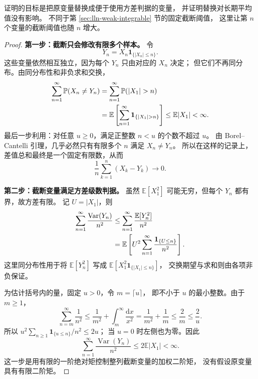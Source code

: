 \documentclass[UTF8]{ctexart}
\begin{document}
证明的目标是把原变量替换成便于使用方差判据的变量，
并证明替换对长期平均值没有影响。
不同于第 \ref{sec:lln-weak-integrable} 节的固定截断阈值，
这里让第 $n$ 个变量的截断阈值也随 $n$ 增大。

\begin{proof}
\textbf{第一步：截断只会修改有限多个样本。}
令
\[
  Y_n=X_n\mathbf1_{\{|X_n|\leq n\}}.
\]
这些变量依然相互独立，因为每个 $Y_n$ 只由对应的 $X_n$ 决定；
但它们不再同分布。由同分布性和非负求和交换，
\begin{align}
  \sum_{n=1}^\infty\mathbb P(X_n\neq Y_n)
  &=\sum_{n=1}^\infty\mathbb P(|X_1|>n) \notag\\
  &=\mathbb E\left[\sum_{n=1}^\infty
       \mathbf1_{\{|X_1|>n\}}\right]
  \leq\mathbb E|X_1|<\infty.
  \label{eq:lln-truncation-events}
\end{align}
最后一步利用：对任意 $u\geq0$，满足正整数 $n<u$ 的个数不超过 $u$。
由 Borel--Cantelli 引理，几乎必然只有有限多个 $n$ 满足 $X_n\neq Y_n$。
所以在这样的记录上，差值总和最终是一个固定有限数，从而
\begin{equation}
  \frac1n\sum_{k=1}^n(X_k-Y_k)\longrightarrow0.
  \label{eq:lln-truncation-difference}
\end{equation}

\textbf{第二步：截断变量满足方差级数判据。}
虽然 $\mathbb E[X_1^2]$ 可能无穷，但每个 $Y_n$ 都有界，故方差有限。
记 $U=|X_1|$，则
\begin{align}
  \sum_{n=1}^\infty\frac{\operatorname{Var}(Y_n)}{n^2}
  &\leq\sum_{n=1}^\infty\frac{\mathbb E[Y_n^2]}{n^2} \notag\\
  &=\mathbb E\left[
     U^2\sum_{n=1}^\infty\frac{\mathbf1_{\{U\leq n\}}}{n^2}
     \right].
  \label{eq:lln-truncated-variance}
\end{align}
这里同分布性用于将 $\mathbb E[Y_n^2]$ 写成
$\mathbb E[X_1^2\mathbf1_{\{|X_1|\leq n\}}]$，
交换期望与求和则由各项非负保证。

为估计括号内的量，固定 $u>0$，令 $m=\lceil u\rceil$，
即不小于 $u$ 的最小整数。由于 $m\geq1$，
\[
  \sum_{n=m}^\infty\frac1{n^2}
  \leq\frac1{m^2}+\int_m^\infty\frac{\mathrm dx}{x^2}
  =\frac1{m^2}+\frac1m
  \leq\frac2m
  \leq\frac2u.
\]
所以
$u^2\sum_{n\geq1}\mathbf1_{\{u\leq n\}}/n^2\leq2u$；
当 $u=0$ 时左侧也为零。因此
\begin{equation}
  \sum_{n=1}^\infty\frac{\operatorname{Var}(Y_n)}{n^2}
  \leq2\mathbb E|X_1|<\infty.
  \label{eq:lln-truncated-variance-finite}
\end{equation}
这一步是用有限的一阶绝对矩控制整列截断变量的加权二阶矩，
没有假设原变量具有有限二阶矩。


\end{proof}
\end{document}
